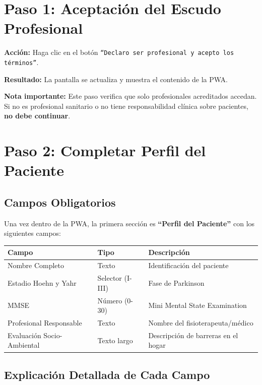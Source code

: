 \documentclass[12pt,a4paper,spanish,oneside]{book}
\begin{document}
\section{Paso 1: Aceptación del Escudo Profesional}

\textbf{Acción:} Haga clic en el botón \texttt{``Declaro ser profesional y acepto los términos''}.

\textbf{Resultado:} La pantalla se actualiza y muestra el contenido de la PWA.

\begin{conceptobox}
  \textbf{Nota importante:} Este paso verifica que solo profesionales acreditados accedan. Si no es profesional sanitario o no tiene responsabilidad clínica sobre pacientes, \textbf{no debe continuar}.
\end{conceptobox}

\section{Paso 2: Completar Perfil del Paciente}

\subsection{Campos Obligatorios}

Una vez dentro de la PWA, la primera sección es \textbf{``Perfil del Paciente''} con los siguientes campos:

\begin{table}[h]
  \centering
  \begin{tabular}{|p{3cm}|p{4cm}|p{4cm}|}
    \hline
    \textbf{Campo} & \textbf{Tipo} & \textbf{Descripción} \\
    \hline
    Nombre Completo & Texto & Identificación del paciente \\
    \hline
    Estadio Hoehn y Yahr & Selector (I-III) & Fase de Parkinson \\
    \hline
    MMSE & Número (0-30) & Mini Mental State Examination \\
    \hline
    Profesional Responsable & Texto & Nombre del fisioterapeuta/médico \\
    \hline
    Evaluación Socio-Ambiental & Texto largo & Descripción de barreras en el hogar \\
    \hline
  \end{tabular}
\end{table}

\subsection{Explicación Detallada de Cada Campo}
\end{document}
